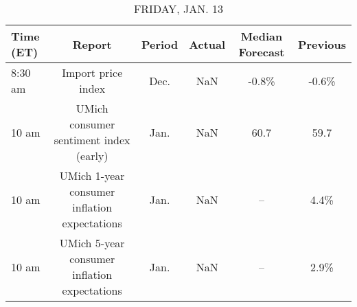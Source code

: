 \documentclass{article}%
\begin{document}
%


\begin{table}[htbp]%
\caption{FRIDAY, JAN. 13}%
\centering%
\begin{adjustbox}{width=1\textwidth}%
\begin{tabular}{lccccc}
\toprule
Time (ET) &                                       Report & Period & Actual & Median Forecast & Previous \\
\midrule
  8:30 am &                           Import price index &   Dec. &    NaN &           -0.8\% &    -0.6\% \\
    10 am &       UMich consumer sentiment index (early) &   Jan. &    NaN &            60.7 &     59.7 \\
    10 am & UMich 1-year consumer inflation expectations &   Jan. &    NaN &              -- &     4.4\% \\
    10 am & UMich 5-year consumer inflation expectations &   Jan. &    NaN &              -- &     2.9\% \\
\bottomrule
\end{tabular}
%
\end{adjustbox}%
\end{table}
\end{document}
